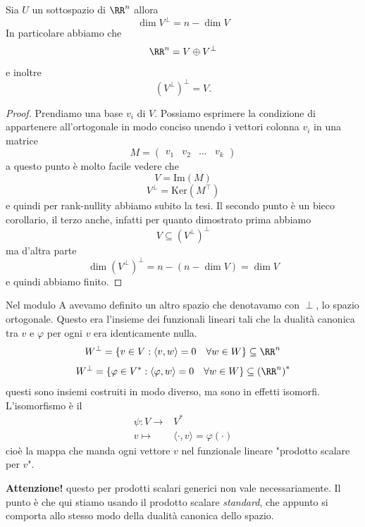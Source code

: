 \documentclass[11pt]{scrartcl}
\newcommand{\Immagine}[1]{\text{Im}\left(#1\right)}
\renewcommand{\ker}[1]{\text{Ker}\left(#1\right)}
\begin{document}
   	 \begin{proposition}
   	 	Sia $U$ un sottospazio di $\RR^n$ allora 
   	 	$$\dim V^\perp = n-\dim V$$
   	 	In particolare abbiamo che 
   	 	$$\RR^n = V\oplus V^\perp$$ 
   	 	e inoltre 
   	 	$$\left(V^\perp\right)^\perp=V.$$
   	 \end{proposition}
   	 \begin{proof}
   	 	Prendiamo una base $v_i$ di $V$. Possiamo esprimere la condizione di appartenere all'ortogonale in modo conciso unendo i vettori colonna $v_i$ in una matrice
   	 	$$M=\left(\begin{array}{c|c|c|c}
   	 		v_1 & v_2 & \dots & v_k
   	 	\end{array}\right)$$  
   	 	a questo punto è molto facile vedere che 
   	 	$$V=\Immagine{M}$$
   	 	$$V^\perp = \ker{M^\intercal}$$
   	 	e quindi per rank-nullity abbiamo subito la tesi. Il secondo punto è un bieco corollario, il terzo anche, infatti per quanto dimostrato prima abbiamo
   	 	$$V \subseteq \left(V^\perp\right)^\perp$$
   	 	ma d'altra parte $$\dim \left(V^\perp\right)^\perp=n-(n-\dim V)=\dim V$$
   	 	e quindi abbiamo finito.
   	 \end{proof}
   	 
   	 Nel modulo A avevamo definito un altro spazio che denotavamo con $\perp$, lo spazio ortogonale. Questo era l'insieme dei funzionali lineari tali che la dualità canonica tra $v$ e $\varphi$ per ogni $v$ era identicamente nulla. 
   	 $$W^\perp=\left\{v\in V: \langle v,w \rangle =0 \quad \forall w\in W\right\}\subseteq \RR^n$$
   	 $$W^\perp= \left\{\varphi \in V^*: \langle\varphi,w \rangle=0 \quad \forall w\in W\right\} \subseteq \left(\RR^n\right)^*$$
   	 questi sono insiemi costruiti in modo diverso, ma sono in effetti isomorfi. L'isomorfismo è il 
   	 \begin{align*}
   	 	\psi :  V \to & V^* \\
   	 			v \mapsto & \langle \cdot, v\rangle = \varphi(\cdot)
   	 \end{align*}
   	 cioè la mappa che manda ogni vettore $v$ nel funzionale lineare "prodotto scalare per $v$".
   	 \begin{remark}
   	 	\textbf{Attenzione!} questo per prodotti scalari generici non vale necessariamente. Il punto è che qui stiamo usando il prodotto scalare \textit{standard}, che appunto si comporta allo stesso modo della dualità canonica dello spazio.
   	 \end{remark}
   	 
\end{document}
